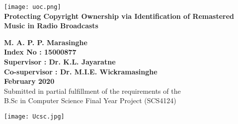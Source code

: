 \begin{titlepage}
    \begin{center}

        \texttt{[image: uoc.png]}\\
        \vspace{24pt}
        \textbf{\Huge{Protecting Copyright Ownership via Identification of Remastered Music in Radio Broadcasts}}


        \vspace{36pt}
        \textbf{{\Large{M. A. P. P. Marasinghe}}}\\
        \textbf{{\Large{Index No : 15000877}}}\\

        \vspace{36pt}
        \textbf{{\Large{Supervisor : Dr. K.L. Jayaratne}}}\\
        \textbf{{\Large{Co-supervisor : Dr. M.I.E. Wickramasinghe}}}\\

        \vspace{60pt}
        \textbf{{\Large{February 2020}}}\\
        
        \vspace{12pt}
        \singlespacing
        \large {Submitted in partial fulfillment of the requirements of the}\\
        \large {B.Sc in Computer Science Final Year Project (SCS4124)}
        
        \vspace{24pt}
        \texttt{[image: Ucsc.jpg]}\\

    \end{center}
\end{titlepage}